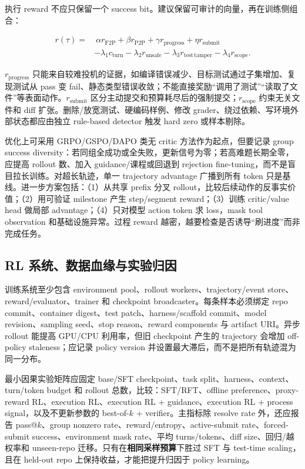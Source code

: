 \documentclass[10pt,a4paper,UTF8,fontset=none]{ctexart}
\begin{document}
执行 reward 不应只保留一个 success bit。建议保留可审计的向量，再在训练侧组合：

\begin{equation}
\begin{aligned}
r(\tau)=&\ \alpha r_{\mathrm{F2P}}+\beta r_{\mathrm{P2P}}+\gamma r_{\mathrm{progress}}
+\eta r_{\mathrm{submit}} \\
&-\lambda_1 c_{\mathrm{turn}}-\lambda_2 r_{\mathrm{unsafe}}
-\lambda_3 r_{\mathrm{test\,tamper}}-\lambda_4 r_{\mathrm{scope}} .
\end{aligned}
\label{eq:reward}
\end{equation}

$r_{\mathrm{progress}}$ 只能来自较难投机的证据，如编译错误减少、目标测试通过子集增加、复现测试从 pass 变 fail、静态类型错误收敛；不能直接奖励“调用了测试”“读取了文件”等表面动作。$r_{\mathrm{submit}}$ 区分主动提交和预算耗尽后的强制提交；$r_{\mathrm{scope}}$ 约束无关文件和 diff 扩张。删除/放宽测试、硬编码样例、修改 grader、绕过依赖、写环境外部状态都应由独立 rule-based detector 触发 hard zero 或样本剔除。

优化上可采用 GRPO/GSPO/DAPO 类无 critic 方法作为起点，但要记录 group success diversity：若同组全成功或全失败，更新信号为零；若高难题长期全零，应提高 rollout 数、加入 guidance/课程或回退到 rejection fine-tuning，而不是盲目拉长训练。对超长轨迹，单一 trajectory advantage 广播到所有 token 只是基线。进一步方案包括：（1）从共享 prefix 分叉 rollout，比较后续动作的反事实价值；（2）用可验证 milestone 产生 step/segment reward；（3）训练 critic/value head 做局部 advantage；（4）只对模型 action token 求 loss，mask tool observation 和基础设施异常。过程 reward 越密，越要检查是否诱导“刷进度”而非完成任务。

\subsection{RL 系统、数据血缘与实验归因}

训练系统至少包含 environment pool、rollout workers、trajectory/event store、reward/evaluator、trainer 和 checkpoint broadcaster。每条样本必须绑定 repo commit、container digest、test patch、harness/scaffold commit、model revision、sampling seed、stop reason、reward components 与 artifact URI。异步 rollout 能提高 GPU/CPU 利用率，但旧 checkpoint 产生的 trajectory 会增加 off-policy staleness；应记录 policy version 并设置最大滞后，而不是把所有轨迹混为同一分布。

最小因果实验矩阵应固定 base/SFT checkpoint、task split、harness、context、turn/token budget 和 rollout 总数，比较：SFT/RFT、offline preference、proxy-reward RL、execution RL、execution RL + guidance、execution RL + process signal，以及不更新参数的 best-of-$k$ + verifier。主指标除 resolve rate 外，还应报告 pass@$k$、group nonzero rate、reward/entropy、active-submit rate、forced-submit success、environment mask rate、平均 turns/tokens、diff size、回归/越权率和 unseen-repo 迁移。只有在\textbf{相同采样预算}下胜过 SFT 与 test-time scaling，且在 held-out repo 上保持收益，才能把提升归因于 policy learning。
\end{document}
